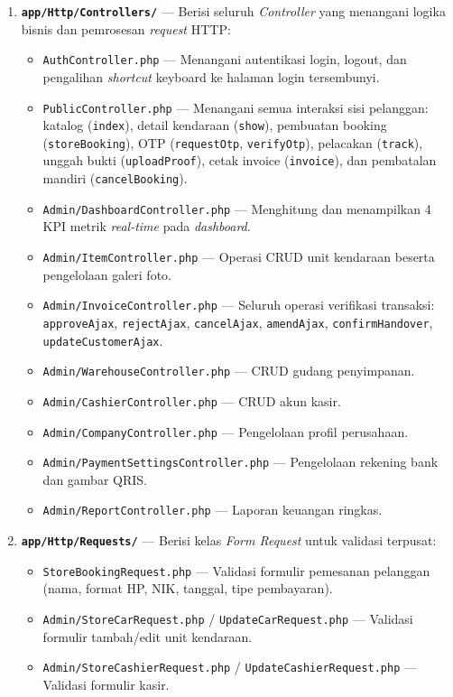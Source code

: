 \documentclass[11pt, a5paper]{article}
\begin{document}
\begin{enumerate}[label=\arabic*.]
  \item \textbf{\texttt{app/Http/Controllers/}} --- Berisi seluruh
        \textit{Controller} yang menangani logika bisnis dan pemrosesan
        \textit{request} HTTP:
    \begin{itemize}
      \item \texttt{AuthController.php} --- Menangani autentikasi login, logout,
            dan pengalihan \textit{shortcut} keyboard ke halaman login tersembunyi.
      \item \texttt{PublicController.php} --- Menangani semua interaksi sisi
            pelanggan: katalog (\texttt{index}), detail kendaraan (\texttt{show}),
            pembuatan booking (\texttt{storeBooking}), OTP
            (\texttt{requestOtp}, \texttt{verifyOtp}), pelacakan
            (\texttt{track}), unggah bukti (\texttt{uploadProof}),
            cetak invoice (\texttt{invoice}), dan pembatalan mandiri
            (\texttt{cancelBooking}).
      \item \texttt{Admin/DashboardController.php} --- Menghitung dan menampilkan
            4 KPI metrik \textit{real-time} pada \textit{dashboard}.
      \item \texttt{Admin/ItemController.php} --- Operasi CRUD unit kendaraan
            beserta pengelolaan galeri foto.
      \item \texttt{Admin/InvoiceController.php} --- Seluruh operasi verifikasi
            transaksi: \texttt{approveAjax}, \texttt{rejectAjax},
            \texttt{cancelAjax}, \texttt{amendAjax}, \texttt{confirmHandover},
            \texttt{updateCustomerAjax}.
      \item \texttt{Admin/WarehouseController.php} --- CRUD gudang penyimpanan.
      \item \texttt{Admin/CashierController.php} --- CRUD akun kasir.
      \item \texttt{Admin/CompanyController.php} --- Pengelolaan profil perusahaan.
      \item \texttt{Admin/PaymentSettingsController.php} --- Pengelolaan rekening
            bank dan gambar QRIS.
      \item \texttt{Admin/ReportController.php} --- Laporan keuangan ringkas.
    \end{itemize}

  \item \textbf{\texttt{app/Http/Requests/}} --- Berisi kelas \textit{Form
        Request} untuk validasi terpusat:
    \begin{itemize}
      \item \texttt{StoreBookingRequest.php} --- Validasi formulir pemesanan
            pelanggan (nama, format HP, NIK, tanggal, tipe pembayaran).
      \item \texttt{Admin/StoreCarRequest.php} / \texttt{UpdateCarRequest.php}
            --- Validasi formulir tambah/edit unit kendaraan.
      \item \texttt{Admin/StoreCashierRequest.php} /
            \texttt{UpdateCashierRequest.php} --- Validasi formulir kasir.
    \end{itemize}


\end{enumerate}
\end{document}
